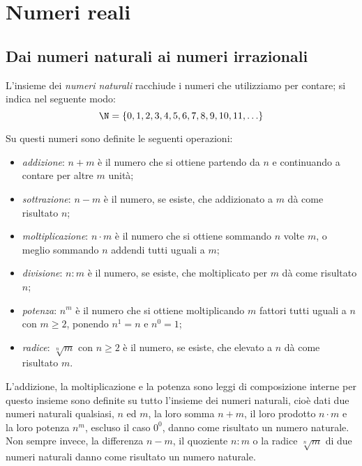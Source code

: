 

\chapter{Numeri reali}
\section{Dai numeri naturali ai numeri irrazionali}

L'insieme dei \emph{numeri naturali} racchiude 
i numeri che utilizziamo per contare; si indica nel seguente modo:
\[\N=\{0,1,2,3,4,5,6,7,8,9,10,11,\ldots\}\]

Su questi numeri sono definite le seguenti operazioni:
\begin{itemize}[noitemsep] 
\item \emph{addizione}: \(n+m\) è il numero che si ottiene partendo da 
\(n\) e continuando a contare per altre \(m\) unità;
\item \emph{sottrazione}: \(n-m\) è il numero, se esiste, che 
addizionato a \(m\) dà come risultato \(n\);
\item \emph{moltiplicazione}: \(n \cdot m\) è il numero che si ottiene 
sommando \(n\) volte \(m\), o meglio sommando \(n\) addendi tutti uguali 
a \(m\);
\item \emph{divisione}: \(n:m\) è il numero, se esiste, che 
moltiplicato per \(m\) dà come risultato \(n\);
\item \emph{potenza}: \(n^{m}\) è il numero che si ottiene moltiplicando 
\(m\) fattori tutti uguali a \(n\) con \(m \ge 2\), ponendo \(n^{1}=n\) e 
\(n^{0}=1\);
\item \emph{radice}: \(\sqrt[{n}]{m}\) con \(n\ge 2\) è il numero, se 
esiste, 
che elevato a \(n\) dà come risultato \(m\).
\end{itemize} 

L'addizione, la moltiplicazione e la potenza sono leggi di composizione 
interne per questo insieme sono 
definite su tutto l'insieme dei numeri naturali, cioè dati due numeri 
naturali qualsiasi, \(n\) ed \(m\), la loro somma \(n+m\), il loro 
prodotto \(n \cdot m\) e la loro potenza \(n^{m}\), escluso il caso 
\(0^{0}\), danno come risultato un numero naturale. 
Non sempre invece, la differenza \(n-m\), il quoziente \(n:m\) o la 
radice \(\sqrt[{n}]{m}\) di due numeri naturali danno come risultato un 
numero naturale.

